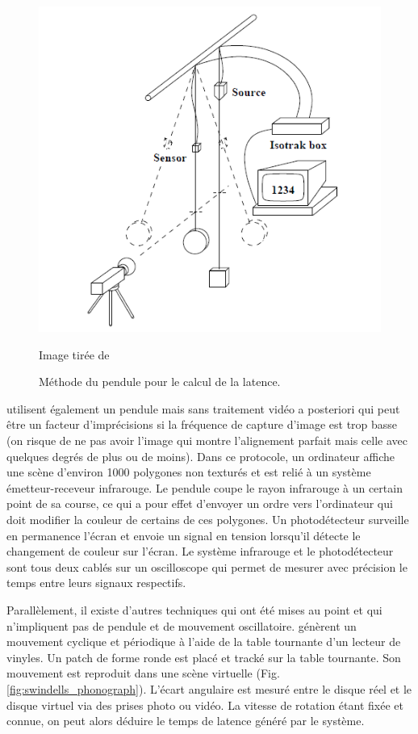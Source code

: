 	\begin{figure}[h]
		\centering
		\includegraphics[scale=.6]{Figures/LiangPendulum}
		\caption{Méthode du pendule pour le calcul de la latence.}{Image tirée de \citep{liang_temporal-spatial_1991}}
		\label{fig:liang_pendulum}
	\end{figure}
	
	\par \citep{jacoby_improved_1996} utilisent également un pendule mais sans traitement vidéo a posteriori qui peut être un facteur d'imprécisions si la fréquence de capture d'image est trop basse (on risque de ne pas avoir l'image qui montre l'alignement parfait mais celle avec quelques degrés de plus ou de moins). Dans ce protocole, un ordinateur affiche une scène d'environ 1000 polygones non texturés et est relié à un système émetteur-receveur infrarouge. Le pendule coupe le rayon infrarouge à un certain point de sa course, ce qui a pour effet d'envoyer un ordre vers l'ordinateur qui doit modifier la couleur de certains de ces polygones. Un photodétecteur surveille en permanence l'écran et envoie un signal en tension lorsqu'il détecte le changement de couleur sur l'écran. Le système infrarouge et le photodétecteur sont tous deux cablés sur un oscilloscope qui permet de mesurer avec précision le temps entre leurs signaux respectifs.
	
	\par Parallèlement, il existe d'autres techniques qui ont été mises au point et qui n'impliquent pas de pendule et de mouvement oscillatoire. \citep{swindells_system_2000} génèrent un mouvement cyclique et périodique à l'aide de la table tournante d'un lecteur de vinyles. Un patch de forme ronde est placé et tracké sur la table tournante. Son mouvement est reproduit dans une scène virtuelle (Fig. \ref{fig:swindells_phonograph}). L'écart angulaire est mesuré entre le disque réel et le disque virtuel via des prises photo ou vidéo. La vitesse de rotation étant fixée et connue, on peut alors déduire le temps de latence généré par le système.
	
